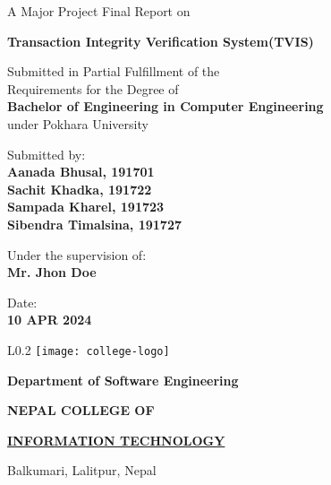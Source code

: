 \documentclass[12pt, a4paper]{report}
\begin{document}
\begin{titlepage}
	\begin{center}

		\large%
		A Major Project Final Report on

		\huge %
		\textbf{Transaction Integrity Verification System(TVIS) }

		\vfill

		\large %
		Submitted in Partial Fulfillment of the \\
		Requirements for the Degree of \\
		\textbf {Bachelor of Engineering in Computer Engineering} \\
		under Pokhara University

		\vfill

		Submitted by: \\
		\textbf {Aanada Bhusal, 191701} \\
		\textbf {Sachit Khadka, 191722} \\
		\textbf {Sampada Kharel, 191723} \\
		\textbf {Sibendra Timalsina, 191727} \\

		\vfill

		Under the supervision of: \\
		\textbf {Mr. Jhon Doe}

		\vfill

		Date: \\
		\textbf {10 APR 2024}

		\vfill

	\end{center}

	\begin{wrapfigure}{L}{0.2\textwidth}
		\centering
		\texttt{[image: college-logo]}
	\end{wrapfigure}

	\selectfont

	\textbf {Department of Software Engineering}

	\Large %
	\textbf {NEPAL COLLEGE OF}

	\LARGE %
	\textbf {\underline {INFORMATION TECHNOLOGY} }

	\small %
	Balkumari, Lalitpur, Nepal


\end{titlepage}
\end{document}
